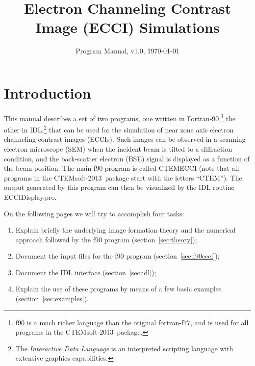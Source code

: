 \documentclass[DIV=calc, paper=letter, fontsize=11pt]{scrartcl}	 %
\title{Electron Channeling Contrast\\ Image (ECCI) Simulations} %
\author{\vspace*{-0.7in}} %
\date{Program Manual, v1.0, \today}
\newcommand{\ctp}{\textsf{CTEMsoft-2013}}
\begin{document}
\maketitle

\begin{figure*}[h]
\leavevmode\centering
{}
\end{figure*}

\renewcommand{\contentsname}{Table of Contents}
{\small\tableofcontents}

\newpage
\section{Introduction}
This manual describes a set of two programs, 
one written in Fortran-90,\footnote{f90 is a much richer language than the original fortran-f77, and is
used for all programs in the \ctp\ package.} 
the other in IDL,\footnote{The \textit{Interactive Data Language} is an interpreted scripting language with extensive graphics capabilities.} 
that can be used for the simulation of near zone axis electron channeling contrast images (ECCIs).  Such images can be
observed in a scanning electron microscope (SEM) when the incident beam is tilted to a diffraction condition, 
and the back-scatter electron (BSE) signal is displayed as a function of the beam position.  The main f90 program
is called \textsf{CTEMECCI} (note that all programs in the \ctp\ package start with the letters ``CTEM'').
The output generated by this program can then be visualized by the IDL routine \textsf{ECCIDisplay.pro}.  

On the following pages we will try to accomplish four tasks:
\begin{enumerate}
	\item Explain briefly the underlying image formation theory and the numerical approach followed by the f90 program (section~\ref{sec:theory});
	\item Document the input files for the f90 program (section~\ref{sec:f90ecci});
	\item Document the IDL interface (section~\ref{sec:idl});
	\item Explain the use of these programs by means of a few basic examples (section~\ref{sec:examples}).
\end{enumerate}



\newpage
\end{document}
